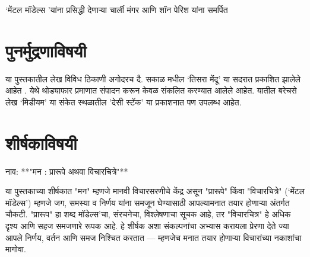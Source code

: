 \begin{dedication}
`मेंटल मॉडेल्स 'यांना प्रसिद्धी देणाऱ्या चार्ली मंगर आणि शॉन पेरिश यांना समर्पित  
\end{dedication}

\clearpage

\chapter*{पुनर्मुद्रणाविषयी}

या पुस्तकातील लेख विविध ठिकाणी अगोदरच दै. सकाळ मधील `तिसरा मेंदू'  या सदरात प्रकाशित झालेले आहेत .  येथे थोड्याफार प्रमाणात संपादन करून केवळ संकलित करण्यात आलेले आहेत.  यातील बरेचसे लेख `मिडीयम'  या संकेत स्थळातील 'देसी स्टॅक' या प्रकाशनात पण उपलब्ध आहेत. 


\chapter*{शीर्षकाविषयी }
नाव: **"मन : प्रारूपे अथवा विचारचित्रे"**

या पुस्तकाच्या शीर्षकात "मन" म्हणजे मानवी विचारसरणीचे केंद्र असून "प्रारूपे" किंवा "विचारचित्रे" (`मेंटल मॉडेल्स') म्हणजे जग, समस्या व निर्णय यांना समजून घेण्यासाठी आपल्यामनात तयार होणाऱ्या अंतर्गत चौकटी. "प्रारूप" हा शब्द मॉडेल्स'चा, संरचनेचा, विश्लेषणाचा सूचक आहे, तर "विचारचित्र" हे अधिक दृश्य आणि सहज समजणारे रूपक आहे. हे शीर्षक अशा संकल्पनांचा अभ्यास करायला प्रेरणा देते ज्या आपले निर्णय, वर्तन आणि समज निश्चित करतात — म्हणजेच मनात तयार होणाऱ्या विचारांच्या नकाशांचा मागोवा.
